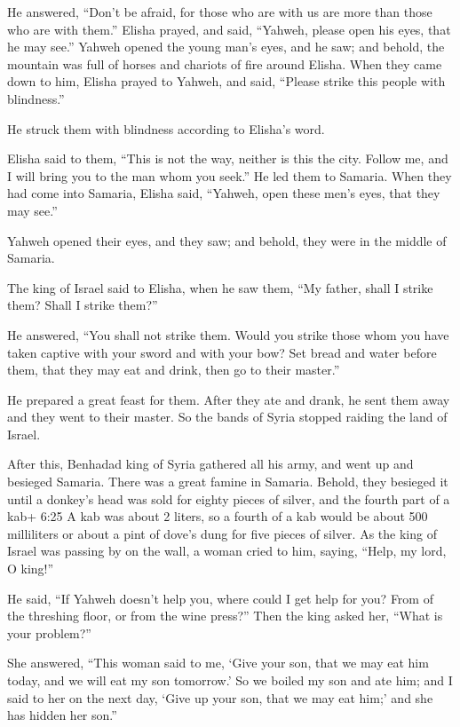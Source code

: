 He answered, ``Don't be afraid, for those who are with us
are more than those who are with them.''  Elisha prayed,
and said, ``Yahweh, please open his eyes, that he may see.'' Yahweh
opened the young man's eyes, and he saw; and behold, the mountain was
full of horses and chariots of fire around Elisha.  When
they came down to him, Elisha prayed to Yahweh, and said, ``Please
strike this people with blindness.''

He struck them with blindness according to Elisha's word.

 Elisha said to them, ``This is not the way, neither is
this the city. Follow me, and I will bring you to the man whom you
seek.'' He led them to Samaria.  When they had come into
Samaria, Elisha said, ``Yahweh, open these men's eyes, that they may
see.''

Yahweh opened their eyes, and they saw; and behold, they were in the
middle of Samaria.

 The king of Israel said to Elisha, when he saw them, ``My
father, shall I strike them? Shall I strike them?''

 He answered, ``You shall not strike them. Would you strike
those whom you have taken captive with your sword and with your bow? Set
bread and water before them, that they may eat and drink, then go to
their master.''

 He prepared a great feast for them. After they ate and
drank, he sent them away and they went to their master. So the bands of
Syria stopped raiding the land of Israel.

 After this, Benhadad king of Syria gathered all his army,
and went up and besieged Samaria.  There was a great famine
in Samaria. Behold, they besieged it until a donkey's head was sold for
eighty pieces of silver, and the fourth part of a kab+ 6:25 A kab was
about 2 liters, so a fourth of a kab would be about 500 milliliters or
about a pint of dove's dung for five pieces of silver.  As
the king of Israel was passing by on the wall, a woman cried to him,
saying, ``Help, my lord, O king!''

 He said, ``If Yahweh doesn't help you, where could I get
help for you? From of the threshing floor, or from the wine press?''
 Then the king asked her, ``What is your problem?''

She answered, ``This woman said to me, `Give your son, that we may eat
him today, and we will eat my son tomorrow.'  So we boiled
my son and ate him; and I said to her on the next day, `Give up your
son, that we may eat him;' and she has hidden her son.''

